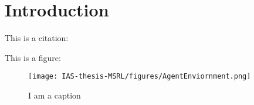\chapter{Introduction}
\label{chap:introduction}
This is a citation: \cite{Vaswani2017}


This is a figure: 

\begin{figure}[ht]
    \centering
    \texttt{[image: IAS-thesis-MSRL/figures/AgentEnviornment.png]}
    \caption{I am a caption}
    \label{fig:my_label}
\end{figure}
